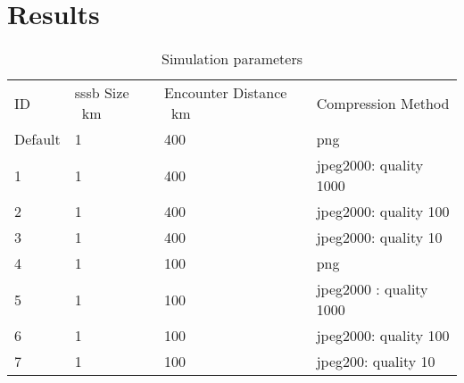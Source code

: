 \section{Results} \label{sec:results}

\begin{table}[htpb]
\caption{Simulation parameters}
\label{tab:sim_params}
\begin{tabular}{l|lll}
ID      & \gls{sssb} Size \SI{}{\kilo\meter} & Encounter Distance \SI{}{\kilo\meter} & Compression Method      \\
Default & 1                                                                                                        & 400                                                                                          & png                     \\
1       & 1                                                                                                        & 400                                                                                          & jpeg2000: quality 1000  \\
2       & 1                                                                                                        & 400                                                                                          & jpeg2000: quality 100   \\
3       & 1                                                                                                        & 400                                                                                          & jpeg2000: quality 10    \\
4       & 1                                                                                                        & 100                                                                                          & png                     \\
5       & 1                                                                                                        & 100                                                                                          & jpeg2000 : quality 1000 \\
6       & 1                                                                                                        & 100                                                                                          & jpeg2000: quality 100   \\
7       & 1                                                                                                        & 100                                                                                          & jpeg200: quality 10     \\

\end{tabular}
\end{table}
